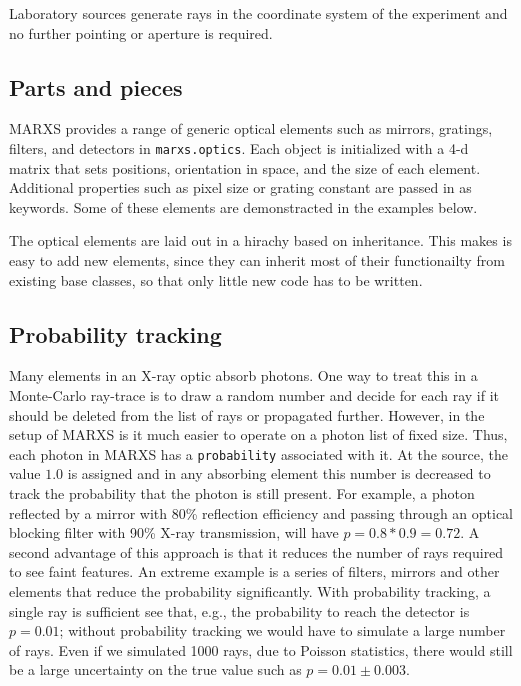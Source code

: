 \documentclass[twocolumn]{aastex61}
\begin{document}
Laboratory sources generate rays in the coordinate system of the experiment and
no further pointing or aperture is required.


\subsection{Parts and pieces}
MARXS provides a range of generic optical elements such as mirrors, gratings,
filters, and detectors in \texttt{marxs.optics}. Each object is initialized
with a 4-d matrix that sets positions, orientation in space, and the size of
each element. Additional properties such as pixel size or grating constant are
passed in as keywords. Some of these elements are demonstracted in the examples
below.

The optical elements are laid out in a hirachy based on inheritance. This makes
is easy to add new elements, since they can inherit most of their functionailty
from existing base classes, so that only little new code has to be written.


\subsection{Probability tracking}
Many elements in an X-ray optic absorb photons. One way to treat this in a
Monte-Carlo ray-trace is to draw a random number and decide for each ray if it
should be deleted from the list of rays or propagated further. However, in the
setup of MARXS is it much easier to operate on a photon list of fixed
size. Thus, each photon in MARXS has a \texttt{probability} associated with
it. At the source, the value $1.0$ is assigned and in any absorbing element
this number is decreased to track the probability that the photon is still
present. For example, a photon reflected by a mirror with 80\% reflection
efficiency and passing through an optical blocking filter with 90\% X-ray
transmission, will have $p=0.8*0.9 = 0.72$. A second advantage of this approach
is that it reduces the number of rays required to see faint features. An
extreme example is a series of filters, mirrors and other elements that reduce
the probability significantly. With probability tracking, a single ray is
sufficient see that, e.g., the probability to reach the detector is $p=0.01$;
without probability tracking we would have to simulate a large number of
rays. Even if we simulated 1000 rays, due to Poisson statistics, there would
still be a large uncertainty on the true value such as $p=0.01\pm0.003$.
\end{document}
